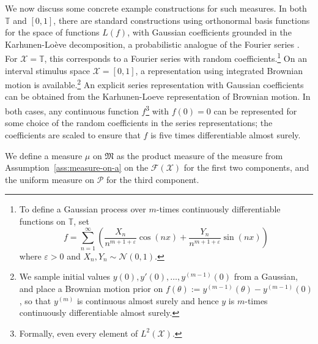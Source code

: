 We now discuss some concrete example constructions for such measures.
In both $\mathbb{T}$ and $[0,1]$, there are standard constructions using orthonormal basis functions for the space of functions $L(f)$, with Gaussian coefficients grounded in the Karhunen-Lo{\`e}ve decomposition, a probabilistic analogue of the Fourier series \cite{karhunen1947lineare, loeve1948functions, papoulis1965random}. 
For $\mathcal{X} = \mathbb{T}$, this corresponds to a Fourier series with random coefficients.\footnote{To define a Gaussian process over $m$-times continuously differentiable functions on $\mathbb{T}$, set
\begin{equation}
    f = \sum_{n=1}^\infty \left(\frac{X_n}{n^{m+1+\varepsilon}} \cos(nx) + \frac{Y_n}{n^{m+1+\varepsilon}} \sin(nx)\right)
\end{equation}
where $\varepsilon>0$ and $X_n, Y_n \sim \mathcal{N}(0,1)$.}
On an interval stimulus space $\mathcal{X} = [0,1]$, a representation using integrated Brownian motion is available.\footnote{We sample initial values $y(0), y'(0), \dots, y^{(m-1)}(0)$ from a Gaussian, and place a Brownian motion prior on $f(\theta) := y^{(m-1)}(\theta) - y^{(m-1)}(0)$, so that \(y^{(m)}\) is continuous almost surely and hence \(y\) is \(m\)-times continuously differentiable almost surely.}
An explicit series representation with Gaussian coefficients can be obtained from the Karhunen-Loeve representation of Brownian motion.
In both cases, any continuous function $f$\footnote{Formally, even every element of $L^2(\mathcal{X})$.} with $f(0) = 0$ can be represented for some choice of the random coefficients in the series representations; the coefficients are scaled to ensure that $f$ is five times differentiable almost surely.




\begin{assumption}\label{ass:measure-on-prod}
We define a measure $\mu$ on $\mathfrak{M}$ as the product measure of the measure from Assumption~\ref{ass:measure-on-a} on the $\mathcal{F}(\mathcal{X})$ for the first two components, and the uniform measure on $\mathcal{P}$ for the third component.
\end{assumption}



